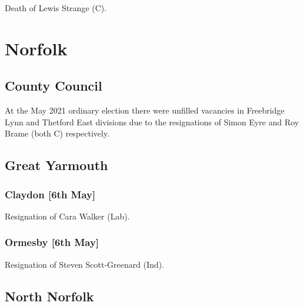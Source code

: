 \documentclass[a4paper,openany]{book}
\begin{document}
\begin{resultsiii}

Death of Lewis Strange (C).

\section{Norfolk}

\subsection*{County Council}

At the May 2021 ordinary election there were unfilled vacancies in Freebridge Lynn and Thetford East divisions due to the resignations of Simon Eyre and Roy Brame (both C) respectively.

\subsection*{Great Yarmouth}

\subsubsection*{Claydon \hspace*{\fill}\nolinebreak[1]%
	\enspace\hspace*{\fill}
	[6th May]}


Resignation of Cara Walker (Lab).

\subsubsection*{Ormesby \hspace*{\fill}\nolinebreak[1]%
	\enspace\hspace*{\fill}
	[6th May]}


Resignation of Steven Scott-Greenard (Ind).

\subsection*{North Norfolk}


\end{resultsiii}
\end{document}
